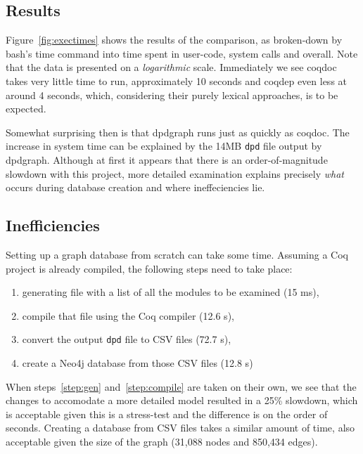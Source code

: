 \subsection{Results}

Figure~\ref{fig:exectimes} shows the results of the comparison, as broken-down
by bash's time command into time spent in user-code, system calls and overall.
Note that the data is presented on a \emph{logarithmic} scale. Immediately
we see coqdoc takes very little time to run, approximately 10 seconds and coqdep
even less at around 4 seconds, which, considering their purely lexical
approaches, is to be expected.

Somewhat surprising then is that dpdgraph runs just as quickly as coqdoc. The
increase in system time can be explained by the 14MB \texttt{dpd} file output by
dpdgraph. Although at first it appears that there is an order-of-magnitude
slowdown with this project, more detailed examination explains precisely
\emph{what} occurs during database creation and where ineffeciencies lie.

\subsection{Inefficiencies}

Setting up a graph database from scratch can take some time. Assuming a Coq
project is already compiled, the following steps need to take place:

\begin{enumerate}
  \item\label{step:gen} generating file with a list of all the modules to be
    examined (15 ms),
  \item\label{step:compile} compile that file using the Coq compiler (12.6 s),
  \item\label{step:dpd2csv} convert the output \texttt{dpd} file to CSV files (72.7 s),
  \item create a Neo4j database from those CSV files (12.8 s)
\end{enumerate}

When steps~\ref{step:gen} and~\ref{step:compile} are taken on their own, we see
that the changes to accomodate a more detailed model resulted in a 25\%
slowdown, which is acceptable given this is a stress-test and the difference is
on the order of seconds. Creating a database from CSV files takes a similar
amount of time, also acceptable given the size of the graph (31,088 nodes and
850,434 edges).

